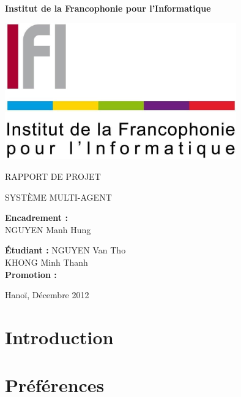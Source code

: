 \documentclass[french,12pt]{report}
\makeatletter
\renewcommand\paragraph{\@startsection{paragraph}{4}{\z@}%
  {-3.25ex\@plus -1ex \@minus -.2ex}%
  {1.5ex \@plus .2ex}%
  {\normalfont\normalsize\bfseries}}
\makeatother
\begin{document}
\title{}
\author{}
\begin{titlepage}
\centerline{\bf\Large Institut de la Francophonie pour l'Informatique}
\begin{center}
\centering
\includegraphics[width=10cm]{./ifi.png}\\[2cm]
\end{center}
\vspace*{0.5cm}
\centerline{\huge \uppercase {RAPPORT DE PROJET}}
\vspace*{0.3cm}
\centerline{\Huge \uppercase {Système Multi-Agent\\[2cm]}}
\vspace*{0.5cm}

\vspace*{0.5cm}
\textbf{Encadrement : }\\
NGUYEN Manh Hung\\
\vspace*{0.5cm}

\textbf{Étudiant :} 
\normalfont NGUYEN Van Tho\\
KHONG Minh Thanh\\
\textbf{Promotion   :} 

\vspace*{2.3cm}
\centerline{Hanoï, Décembre 2012}
\end{titlepage}
\section{Introduction}

\section*{Préférences}
\end{document}
